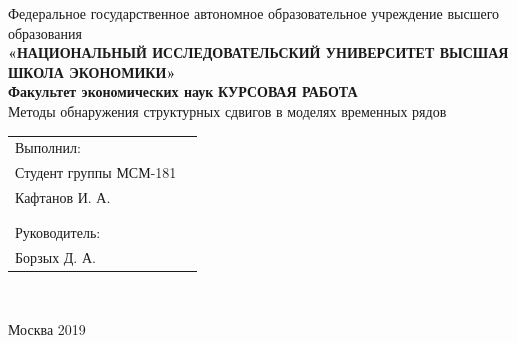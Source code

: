\documentclass[a4paper,14pt,russian]{extarticle}
\begin{document}
	\renewcommand\contentsname{Содержание}
	\thispagestyle{empty}
	
	\begin{center}
		{\footnotesize Федеральное государственное автономное образовательное учреждение высшего образования}\\
		{\small \textbf{«НАЦИОНАЛЬНЫЙ ИССЛЕДОВАТЕЛЬСКИЙ УНИВЕРСИТЕТ ВЫСШАЯ ШКОЛА ЭКОНОМИКИ»}}\\
		\textbf{Факультет экономических наук}	 
		\vspace{0.75cm}
		\vfill
		{\large\textbf{КУРСОВАЯ РАБОТА}}\\
		\vspace{0.75cm}
		Методы обнаружения структурных сдвигов в моделях временных рядов
	\end{center}
	\vfill	
	\begin{small}
	\begin{flushright}
		\begin{tabular}{p{5cm} l}
			Выполнил: & \\
			Студент группы МСМ-181 & \\
			Кафтанов И. А. & \\
			& \\
			& \\
			Руководитель: & \\
			Борзых Д. А. & \\
		\end{tabular}\\
	\end{flushright}	
	\end{small}
	\vfill
	\begin{center}
		{\small Москва 2019}
	\end{center}

	\newpage
	\tableofcontents
	\thispagestyle{empty}
	\newpage
\end{document}
